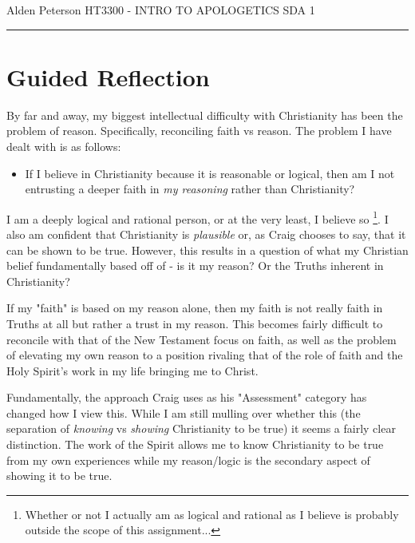 \documentclass[12pt]{turabian-researchpaper}
\begin{document}
\begin{singlespace}
\noindent Alden Peterson \newline
\noindent HT3300 - INTRO TO APOLOGETICS \newline
\noindent SDA 1 \newline
\noindent\rule{4cm}{0.4pt}
\end{singlespace}

\section{Guided Reflection}


By far and away, my biggest intellectual difficulty with Christianity has been the problem of reason. Specifically, reconciling faith vs reason. The problem I have dealt with is as follows:

\begin{itemize}
  \item If I believe in Christianity because it is reasonable or logical, then am I not entrusting a deeper faith in \textit{my reasoning} rather than Christianity?
\end{itemize}

I am a deeply logical and rational person, or at the very least, I believe so \footnote{Whether or not I actually am as logical and rational as I believe is probably outside the scope of this assignment...}. I also am confident that Christianity is \textit{plausible} or, as Craig chooses to say, that it can be shown to be true. However, this results in a question of what my Christian belief fundamentally based off of - is it my reason? Or the Truths inherent in Christianity?

If my "faith" is based on my reason alone, then my faith is not really faith in Truths at all but rather a trust in my reason. This becomes fairly difficult to reconcile with that of the New Testament focus on faith, as well as the problem of elevating my own reason to a position rivaling that of the role of faith and the Holy Spirit's work in my life bringing me to Christ.

Fundamentally, the approach Craig uses as his "Assessment" \autocite[pg.8]{craig2008reasonable} category has changed how I view this. While I am still mulling over whether this (the separation of \textit{knowing} vs \textit{showing} Christianity to be true) it seems a fairly clear distinction. The work of the Spirit allows me to know Christianity to be true from my own experiences while my reason/logic is the secondary aspect of showing it to be true.
\end{document}
